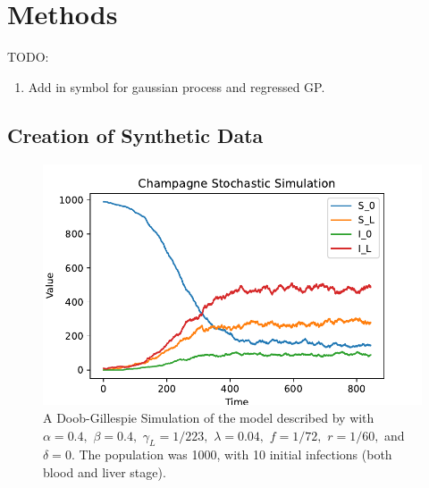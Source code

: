 \chapter{Methods}

TODO:\begin{enumerate}
    \item Add in symbol for gaussian process and regressed GP.
\end{enumerate}

\section{Creation of Synthetic Data}

\begin{figure}[htbp]
    \centering
    \includegraphics[width=\textwidth]{../champagne_GP_images/champagne_simulation.pdf}
    \caption{
        A Doob-Gillespie Simulation of the model described by
        \cite{champagne_using_2022} with $\alpha = 0.4,$ $\beta = 0.4,$
        $\gamma_L = 1 / 223,$ $\lambda = 0.04,$ $f = 1 / 72,$ $r = 1 / 60,$ and
        $\delta = 0.$ The population was 1000, with 10 initial infections
        (both blood and liver stage).
    }
    \label{fig:champ_doob}
\end{figure}

